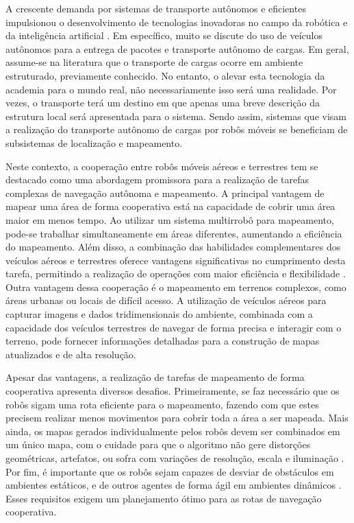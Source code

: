 %
%
\vspace{-42pt}

A crescente demanda por sistemas de transporte autônomos e eficientes impulsionou o desenvolvimento de tecnologias inovadoras no campo da robótica e da inteligência artificial \cite{Chen2023MilestonesSurveys} \cite{Teng2023MotionPerspectives}. Em específico, muito se discute do uso de veículos autônomos para a entrega de pacotes e transporte autônomo de cargas. \cite{Bacheti2022Leader-FollowerDelivery} \cite{Vale2021VeiculoIndustrial} \cite{Bacheti2021ALast-Mile-Delivery}
Em geral, assume-se na literatura que o transporte de cargas ocorre em ambiente estruturado, previamente conhecido. No entanto, o alevar esta tecnologia da academia para o mundo real, não necessariamente isso será uma realidade. Por vezes, o transporte terá um destino em que apenas uma breve descrição da estrutura local será apresentada para o sistema. Sendo assim, sistemas que visam a realização do transporte autônomo de cargas por robôs móveis se beneficiam de subsistemas de localização e mapeamento.\cite{Cadena2016PastAge}

Neste contexto, a cooperação entre robôs móveis aéreos e terrestres tem se destacado como uma abordagem promissora para a realização de tarefas complexas de navegação autônoma e mapeamento. A principal vantagem de mapear uma área de forma cooperativa está na capacidade de cobrir uma área maior em menos tempo. Ao utilizar um sistema multirrobô para mapeamento, pode-se trabalhar simultaneamente em áreas diferentes, aumentando a eficiência do mapeamento\cite{Feng2020AnSystems}. Além disso, a combinação das habilidades complementares dos veículos aéreos e terrestres oferece vantagens significativas no cumprimento desta tarefa, permitindo a realização de operações com maior eficiência e flexibilidade \cite{Bacheti2022Leader-FollowerDelivery}. Outra vantagem dessa cooperação é o mapeamento em terrenos complexos, como áreas urbanas ou locais de difícil acesso. A utilização de veículos aéreos para capturar imagens e dados tridimensionais do ambiente, combinada com a capacidade dos veículos terrestres de navegar de forma precisa e interagir com o terreno, pode fornecer informações detalhadas para a construção de mapas atualizados e de alta resolução.

Apesar das vantagens, a realização de tarefas de mapeamento de forma cooperativa apresenta diversos desafios. Primeiramente, se faz necessário que os robôs sigam uma rota eficiente para o mapeamento, fazendo com que estes precisem realizar menos movimentos para cobrir toda a área a ser mapeada.  Mais ainda, os mapas gerados individualmente pelos robôs devem ser combinados em um único mapa, com o cuidade para que o algoritmo não gere distorções geométricas, artefatos, ou sofra com variações de resolução, escala e iluminação \cite{Bavle2023FromSurvey}\cite{AbaspurKazerouni2022ASLAM}. Por fim, é importante que os robôs sejam capazes de desviar de obstáculos em ambientes estáticos, e de outros agentes de forma ágil em ambientes dinâmicos \cite{Li2022VisualDetection}. Esses requisitos exigem um planejamento ótimo para as rotas de navegação cooperativa\cite{Vasconcelos2020Real-timeMissions}.

